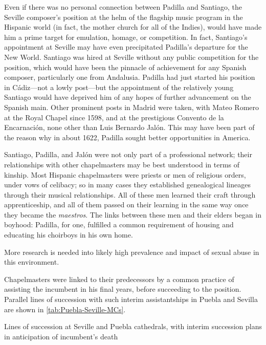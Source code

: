 Even if there was no personal connection between Padilla and Santiago, the
Seville composer's position at the helm of the flagship music program in the
Hispanic world (in fact, the mother church for all of the Indies), would have
made him a prime target for emulation, homage, or competition.
In fact, Santiago's appointment at Seville may have even precipitated Padilla's
departure for the New World.
Santiago was hired at Seville without any public competition for the position,
which would have been the pinnacle of achievement for any Spanish composer,
particularly one from Andalusia.
Padilla had just started his position in Cádiz---not a lowly post---but the
appointment of the relatively young Santiago would have deprived him of any
hopes of further advancement on the Spanish main.
Other prominent posts in Madrid were taken, with Mateo Romero at the Royal
Chapel since 1598, and at the prestigious Convento de la Encarnación, none other
than Luis Bernardo Jalón.%
    \Autocite{Ezquerro:JalonLB} 
This may have been part of the reason why in about 1622, Padilla sought better
opportunities in America.

Santiago, Padilla, and Jalón were not only part of a professional network; their
relationships with other chapelmasters may be best understood in terms of
kinship.
Most Hispanic chapelmasters were priests or men of religious orders, under vows
of celibacy; so in many cases they established genealogical lineages through
their musical relationships.
All of these men learned their craft through apprenticeship, and all of them
passed on their learning in the same way once they became the \emph{maestros}.
The links between these men and their elders began in boyhood: Padilla, for one,
fulfilled a common requirement of housing and educating his choirboys in his own
home.%
\begin{Footnote} 
    More research is needed into likely high prevalence and impact of sexual
    abuse in this environment.
\end{Footnote}
Chapelmasters were linked to their predecessors by a common practice of
assisting the incumbent in his final years, before succeeding to the position.
Parallel lines of succession with such interim assistantships in Puebla and
Sevilla are shown in \cref{tab:Puebla-Seville-MCs}.

\begin{table}
    \caption{Lines of succession at Seville and Puebla cathedrals, with interim
    succession plans in anticipation of incumbent's death}
  
    \label{tab:Puebla-Seville-MCs}

\end{table}

